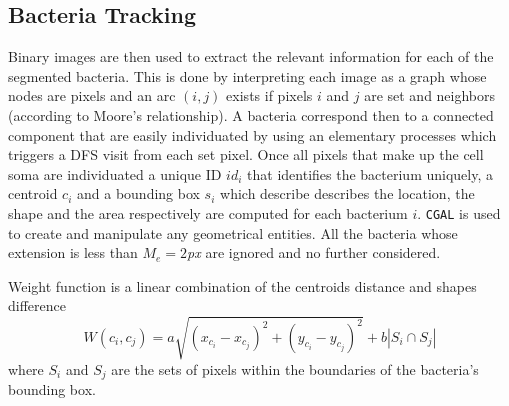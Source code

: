 \documentclass[conference]{IEEEtran}
\begin{document}
\subsection{Bacteria Tracking}
\label{ciao}
Binary images are then used to extract the relevant information for each of the segmented bacteria. This is done by interpreting each image as a graph whose nodes are pixels and an arc $(i,j)$ exists if pixels $i$ and $j$ are set and neighbors (according to Moore's relationship). A bacteria correspond then to a connected component that are easily individuated by using an elementary processes which triggers a DFS visit from each set pixel. Once all pixels that make up the cell soma are individuated a unique ID $id_i$ that  identifies the bacterium uniquely, a centroid $c_i$ and a bounding box $s_i$ which describe describes the location, the shape and the area respectively are computed for each bacterium $i$. \texttt{CGAL} \cite{CGAL} is used to create and manipulate any geometrical entities. All the bacteria whose extension is less than $M_e = 2$\textit{px} are ignored and no further considered.

Weight function is a linear combination of the centroids distance and shapes difference 
\begin{equation}
\label{sec:bacttracking}
W(c_i,c_j) = a \sqrt{(x_{c_i} - x_{c_j})^2 + (y_{c_i}-y_{c_j})^2} + b |S_i \cap S_j|
\end{equation}
where $S_i$ and $S_j$ are the sets of pixels within the boundaries of the bacteria's  bounding box.
\end{document}
